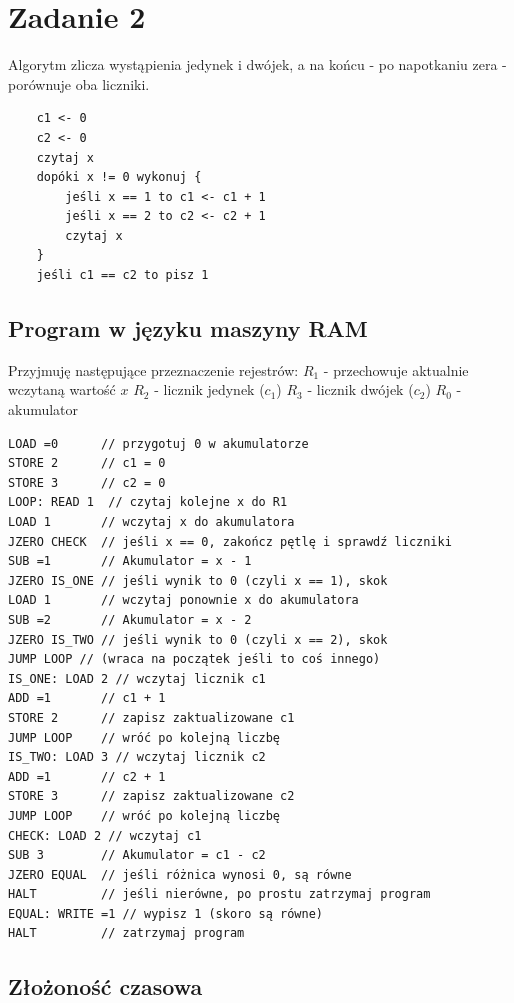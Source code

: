 \documentclass[en, color=black, device=pad, mode=geey]{elegantnote}
\begin{document}
\newpage

\section{Zadanie 2}
Algorytm zlicza wystąpienia jedynek i dwójek, a na końcu - po napotkaniu zera - porównuje oba liczniki.

\begin{lstlisting}
    c1 <- 0
    c2 <- 0
    czytaj x
    dopóki x != 0 wykonuj {
        jeśli x == 1 to c1 <- c1 + 1
        jeśli x == 2 to c2 <- c2 + 1
        czytaj x
    }
    jeśli c1 == c2 to pisz 1
\end{lstlisting}

\newpage
\subsection{Program w języku maszyny RAM}
Przyjmuję następujące przeznaczenie rejestrów: $R_1$ - przechowuje aktualnie wczytaną wartość $x$
$R_2$ - licznik jedynek ($c_1$)
$R_3$ - licznik dwójek ($c_2$)
$R_0$ - akumulator

\begin{lstlisting}
LOAD =0      // przygotuj 0 w akumulatorze
STORE 2      // c1 = 0
STORE 3      // c2 = 0
LOOP: READ 1  // czytaj kolejne x do R1
LOAD 1       // wczytaj x do akumulatora
JZERO CHECK  // jeśli x == 0, zakończ pętlę i sprawdź liczniki
SUB =1       // Akumulator = x - 1
JZERO IS_ONE // jeśli wynik to 0 (czyli x == 1), skok
LOAD 1       // wczytaj ponownie x do akumulatora
SUB =2       // Akumulator = x - 2
JZERO IS_TWO // jeśli wynik to 0 (czyli x == 2), skok
JUMP LOOP // (wraca na początek jeśli to coś innego)
IS_ONE: LOAD 2 // wczytaj licznik c1
ADD =1       // c1 + 1
STORE 2      // zapisz zaktualizowane c1
JUMP LOOP    // wróć po kolejną liczbę
IS_TWO: LOAD 3 // wczytaj licznik c2
ADD =1       // c2 + 1
STORE 3      // zapisz zaktualizowane c2
JUMP LOOP    // wróć po kolejną liczbę
CHECK: LOAD 2 // wczytaj c1
SUB 3        // Akumulator = c1 - c2
JZERO EQUAL  // jeśli różnica wynosi 0, są równe
HALT         // jeśli nierówne, po prostu zatrzymaj program
EQUAL: WRITE =1 // wypisz 1 (skoro są równe)
HALT         // zatrzymaj program
\end{lstlisting}

\subsection{Złożoność czasowa}
\end{document}
